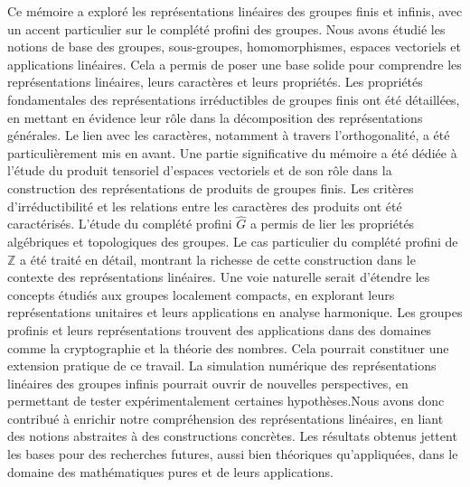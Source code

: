 \documentclass[a4paper, 14pt]{report}
\newcommand{\applyfontsize}{%
	\fontsize{12}{12}\selectfont
}
\begin{document}
\begin{onehalfspace}
{{				Ce mémoire a exploré les représentations linéaires des groupes finis et infinis, avec un accent particulier sur le complété profini des groupes. 
				Nous avons étudié les notions de base des groupes, sous-groupes, homomorphismes, espaces vectoriels et applications linéaires. Cela a permis de poser une base solide pour comprendre les représentations linéaires, leurs caractères et leurs propriétés.
				Les propriétés fondamentales des représentations irréductibles de groupes finis ont été détaillées, en mettant en évidence leur rôle dans la décomposition des représentations générales. Le lien avec les caractères, notamment à travers l’orthogonalité, a été particulièrement mis en avant.
				Une partie significative du mémoire a été dédiée à l'étude du produit tensoriel d'espaces vectoriels et de son rôle dans la construction des représentations de produits de groupes finis. Les critères d’irréductibilité et les relations entre les caractères des produits ont été caractérisés.
				L’étude du complété profini $\widehat{G}$ a permis de lier les propriétés algébriques et topologiques des groupes. Le cas particulier du complété profini de $\mathbb{Z}$ a été traité en détail, montrant la richesse de cette construction dans le contexte des représentations linéaires. Une voie naturelle serait d’étendre les concepts étudiés aux groupes localement compacts, en explorant leurs représentations unitaires et leurs applications en analyse harmonique. Les groupes profinis et leurs représentations trouvent des applications dans des domaines comme la cryptographie et la théorie des nombres. Cela pourrait constituer une extension pratique de ce travail. La simulation numérique des représentations linéaires des groupes infinis pourrait ouvrir de nouvelles perspectives, en permettant de tester expérimentalement certaines hypothèses.Nous avons donc  contribué à enrichir notre compréhension des représentations linéaires, en liant des notions abstraites à des constructions concrètes. Les résultats obtenus jettent les bases pour des recherches futures, aussi bien théoriques qu’appliquées, dans le domaine des mathématiques pures et de leurs applications.
				
			}
			
			
		}
		
		
		{
			\applyfontsize %
			
			\begin{thebibliography}{99}
				

\end{thebibliography}}
\end{onehalfspace}
\end{document}
